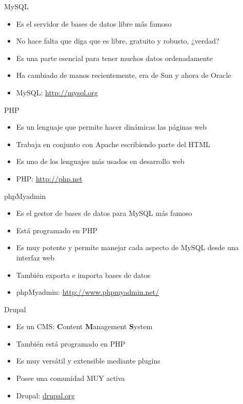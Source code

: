 \documentclass[spanish]{beamer}
\begin{document}
\begin{frame}{MySQL}
\begin{itemize}
\item Es el servidor de bases de datos libre más famoso
\item No hace falta que diga que es libre, gratuito y robusto, ¿verdad?
\item Es una parte esencial para tener muchos datos ordenadamente
\item Ha cambiado de manos recientemente, era de Sun y ahora de Oracle
\item MySQL: \url{http://mysql.org}
\end{itemize}
\end{frame}

\begin{frame}{PHP}
\begin{itemize}
\item Es un lenguaje que permite hacer dinámicas las páginas web
\item Trabaja en conjunto con Apache escribiendo parte del HTML
\item Es uno de los lenguajes más usados en desarrollo web
\item PHP: \url{http://php.net}
\end{itemize}
\end{frame}

\begin{frame}{phpMyadmin}
\begin{itemize}
\item Es el gestor de bases de datos para MySQL más famoso
\item Está programado en PHP
\item Es muy potente y permite manejar cada aspecto de MySQL desde una interfaz web
\item También exporta e importa bases de datos
\item phpMyadmin: \url{http://www.phpmyadmin.net/}
\end{itemize}
\end{frame}

\begin{frame}{Drupal}
\begin{itemize}
\item Es un CMS: {\bf C}ontent {\bf M}anagement {\bf S}ystem
\item También está programado en PHP
\item Es muy versátil y extensible mediante plugins
\item Posee una comunidad MUY activa
\item Drupal: \url{drupal.org}
\end{itemize}
\end{frame}
\end{document}
